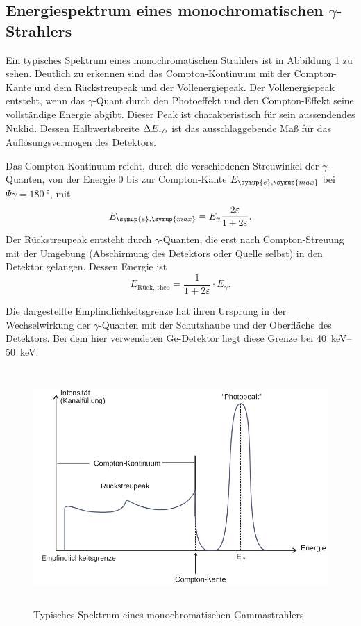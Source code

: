 \subsection{Energiespektrum eines monochromatischen \texorpdfstring{$\gamma$}{gamma}-Strahlers}
Ein typisches Spektrum eines monochromatischen Strahlers ist in Abbildung \ref{fig:Spektrum} zu sehen.
Deutlich zu erkennen sind das Compton-Kontinuum mit der Compton-Kante und dem Rückstreupeak und der Vollenergiepeak.
Der Vollenergiepeak entsteht, wenn das $\gamma$-Quant durch den Photoeffekt und den Compton-Effekt seine vollständige Energie abgibt. 
Dieser Peak ist charakteristisch für sein aussendendes Nuklid.
Dessen Halbwertsbreite $\Delta E_{\sfrac{1}{2}}$ ist das ausschlaggebende Maß für das Auflösungsvermögen des Detektors.

Das Compton-Kontinuum reicht, durch die verschiedenen Streuwinkel der $\gamma$-Quanten, von der Energie \num{0} bis zur Compton-Kante $E_{\symup{e},\symup{max}}$ bei $\Psi{\gamma}=\SI{180}{\degree}$, mit
\begin{equation}
\label{eqn:Com_Kante}
E_{\symup{e},\symup{max}}=E_{\gamma}\frac{2\varepsilon}{1+2\varepsilon}.
\end{equation}
Der Rückstreupeak entsteht durch $\gamma$-Quanten, die erst nach Compton-Streuung mit der Umgebung (Abschirmung des Detektors oder Quelle selbst) in den Detektor gelangen.
Dessen Energie ist
\begin{equation}
  \label{eqn:rueck}
  E_\text{Rück, theo} = \frac{1}{1+2\varepsilon} \cdot E_{\gamma}.
\end{equation}

Die dargestellte Empfindlichkeitsgrenze hat ihren Ursprung in der Wechselwirkung der $\gamma$-Quanten mit der Schutzhaube und der Oberfläche des Detektors.
Bei dem hier verwendeten Ge-Detektor liegt diese Grenze bei \SIrange{40}{50}{\kilo\electronvolt}.
 \begin{figure}
   \centering
   \includegraphics[height=9cm]{content/pictures/Spektrum.png}
   \caption{Typisches Spektrum eines monochromatischen Gammastrahlers.\cite{V18}}
   \label{fig:Spektrum}
 \end{figure}